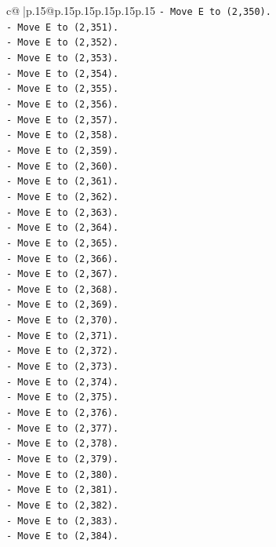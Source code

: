 \documentclass{article}
\begin{document}
{\begin{supertabular}{c@{$\;$}|p{.15\linewidth}@{}p{.15\linewidth}p{.15\linewidth}p{.15\linewidth}p{.15\linewidth}p{.15\linewidth}}
{{{\texttt{{-} Move E to (2,350).} \\
\texttt{{-} Move E to (2,351).} \\
\texttt{{-} Move E to (2,352).} \\
\texttt{{-} Move E to (2,353).} \\
\texttt{{-} Move E to (2,354).} \\
\texttt{{-} Move E to (2,355).} \\
\texttt{{-} Move E to (2,356).} \\
\texttt{{-} Move E to (2,357).} \\
\texttt{{-} Move E to (2,358).} \\
\texttt{{-} Move E to (2,359).} \\
\texttt{{-} Move E to (2,360).} \\
\texttt{{-} Move E to (2,361).} \\
\texttt{{-} Move E to (2,362).} \\
\texttt{{-} Move E to (2,363).} \\
\texttt{{-} Move E to (2,364).} \\
\texttt{{-} Move E to (2,365).} \\
\texttt{{-} Move E to (2,366).} \\
\texttt{{-} Move E to (2,367).} \\
\texttt{{-} Move E to (2,368).} \\
\texttt{{-} Move E to (2,369).} \\
\texttt{{-} Move E to (2,370).} \\
\texttt{{-} Move E to (2,371).} \\
\texttt{{-} Move E to (2,372).} \\
\texttt{{-} Move E to (2,373).} \\
\texttt{{-} Move E to (2,374).} \\
\texttt{{-} Move E to (2,375).} \\
\texttt{{-} Move E to (2,376).} \\
\texttt{{-} Move E to (2,377).} \\
\texttt{{-} Move E to (2,378).} \\
\texttt{{-} Move E to (2,379).} \\
\texttt{{-} Move E to (2,380).} \\
\texttt{{-} Move E to (2,381).} \\
\texttt{{-} Move E to (2,382).} \\
\texttt{{-} Move E to (2,383).} \\
\texttt{{-} Move E to (2,384).} \\
}}}
\end{supertabular}}
\end{document}
